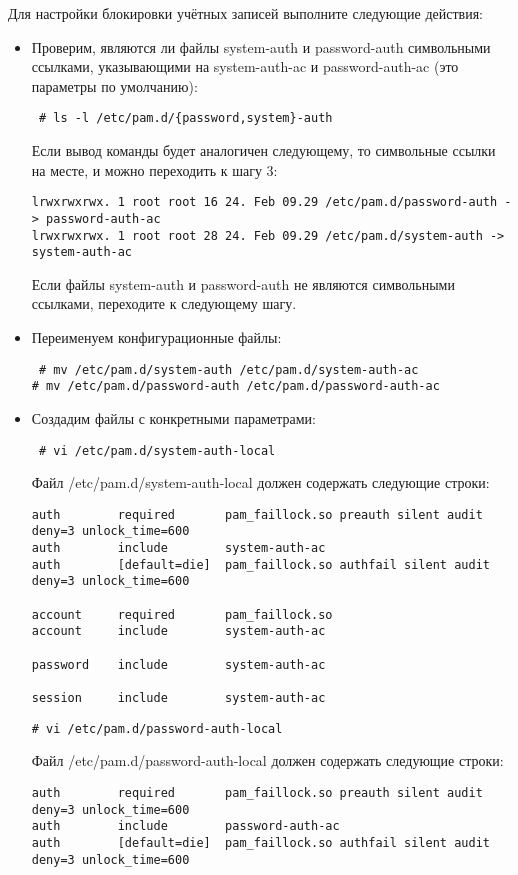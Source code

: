 \documentclass[a4paper,10pt,twoside]{article}
\begin{document}
Для настройки блокировки учётных записей выполните следующие действия:


\begin{itemize}
 \item Проверим, являются ли файлы system-auth и password-auth символьными ссылками, указывающими на system-auth-ac и password-auth-ac (это параметры по умолчанию):
\begin{verbatim}
 # ls -l /etc/pam.d/{password,system}-auth
\end{verbatim} 
Если вывод команды будет аналогичен следующему, то символьные ссылки на месте, и можно переходить к шагу 3:
\begin{verbatim}
lrwxrwxrwx. 1 root root 16 24. Feb 09.29 /etc/pam.d/password-auth -> password-auth-ac
lrwxrwxrwx. 1 root root 28 24. Feb 09.29 /etc/pam.d/system-auth -> system-auth-ac
\end{verbatim} 
Если файлы system-auth и password-auth не являются символьными ссылками, переходите к следующему шагу.
\item Переименуем конфигурационные файлы:
\begin{verbatim}
 # mv /etc/pam.d/system-auth /etc/pam.d/system-auth-ac
# mv /etc/pam.d/password-auth /etc/pam.d/password-auth-ac
\end{verbatim} 
\item Создадим файлы с конкретными параметрами:
\begin{verbatim}
 # vi /etc/pam.d/system-auth-local
\end{verbatim} 
Файл /etc/pam.d/system-auth-local должен содержать следующие строки:
\begin{verbatim}
auth        required       pam_faillock.so preauth silent audit deny=3 unlock_time=600
auth        include        system-auth-ac
auth        [default=die]  pam_faillock.so authfail silent audit deny=3 unlock_time=600

account     required       pam_faillock.so
account     include        system-auth-ac

password    include        system-auth-ac

session     include        system-auth-ac
\end{verbatim}
\begin{verbatim}
# vi /etc/pam.d/password-auth-local
\end{verbatim} 
Файл /etc/pam.d/password-auth-local должен содержать следующие строки:
\begin{verbatim}
auth        required       pam_faillock.so preauth silent audit deny=3 unlock_time=600
auth        include        password-auth-ac
auth        [default=die]  pam_faillock.so authfail silent audit deny=3 unlock_time=600


\end{verbatim}
\end{itemize}
\end{document}
